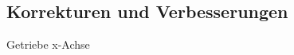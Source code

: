 \documentclass[../../../Bachelorarbeit.tex]{subfiles}
\begin{document}
\subsection{Korrekturen und Verbesserungen}
Getriebe x-Achse
\end{document}
